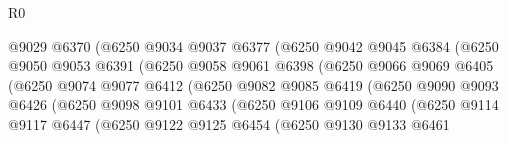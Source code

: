 \begin{lexlean}{R0}
\begin{coremodule}
                              @9029
                              @6370
                              (@6250
                                @9034
                                @9037
                                @6377
                                (@6250
                                  @9042
                                  @9045
                                  @6384
                                  (@6250
                                    @9050
                                    @9053
                                    @6391
                                    (@6250
                                      @9058
                                      @9061
                                      @6398
                                      (@6250
                                        @9066
                                        @9069
                                        @6405
                                        (@6250
                                          @9074
                                          @9077
                                          @6412
                                          (@6250
                                            @9082
                                            @9085
                                            @6419
                                            (@6250
                                              @9090
                                              @9093
                                              @6426
                                              (@6250
                                                @9098
                                                @9101
                                                @6433
                                                (@6250
                                                  @9106
                                                  @9109
                                                  @6440
                                                  (@6250
                                                    @9114
                                                    @9117
                                                    @6447
                                                    (@6250
                                                      @9122
                                                      @9125
                                                      @6454
                                                      (@6250
                                                        @9130
                                                        @9133
                                                        @6461

\end{coremodule}
\end{lexlean}
